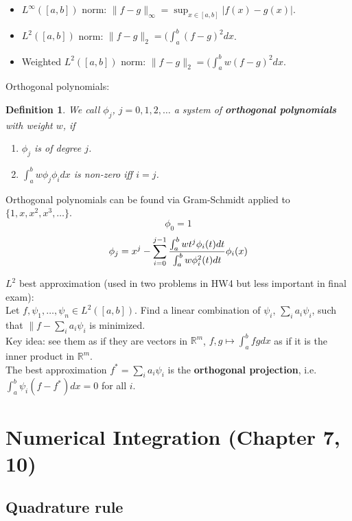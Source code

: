 \documentclass[20pt]{article} %
\theoremstyle{break}
\newtheorem{definition}{Definition}[section]
\begin{document}
\begin{itemize}
\item $L^\infty([a, b])$ norm: $\|f-g\|_{\infty}=\sup_{x\in [a, b]}|f(x)-g(x)|$.
\item $L^2([a, b])$ norm: $\|f-g\|_2=(\int_a^b(f-g)^2dx$.
\item Weighted $L^2([a, b])$ norm: $\|f-g\|_2=(\int_a^bw(f-g)^2dx$.
\end{itemize}

\newpage

Orthogonal polynomials:

\begin{definition}We call $\phi_j$, $j=0, 1, 2, \dots$ a system of {\bf orthogonal polynomials} with weight $w$, if 
  \begin{enumerate}
   \item $\phi_j$ is of degree $j$.
   \item $\int_a^bw\phi_j\phi_idx$ is non-zero iff $i=j$.
  \end{enumerate}
\end{definition}

Orthogonal polynomials can be found via Gram-Schmidt applied to $\{1, x, x^2, x^3, \dots\}$.
  \[\phi_0=1\]
  \[\phi_j=x^j-\sum_{i=0}^{j-1}{\int_a^b wt^j\phi_i(t)dt\over \int_a^b w\phi_i^2(t)dt}\phi_i(x)\]
  
\newpage

$L^2$ best approximation (used in two problems in HW4 but less important in final exam):\\

Let $f, \psi_1, \dots, \psi_n\in L^2([a, b])$. Find a linear combination of $\psi_i$, $\sum_ia_i\psi_i$, such that $\|f-\sum_ia_i\psi_i$ is minimized.\\

Key idea: see them as if they are vectors in $\mathbb{R}^m$, $f, g\mapsto \int_a^bfgdx$ as if it is the inner product in $\mathbb{R}^m$.\\

The best approximation $f^*=\sum_ia_i\psi_i$ is the {\bf orthogonal projection}, i.e. $\int_a^b\psi_i(f-f^*)dx=0$ for all $i$.

\newpage

\section{Numerical Integration (Chapter 7, 10)}

\subsection{Quadrature rule}
\end{document}
